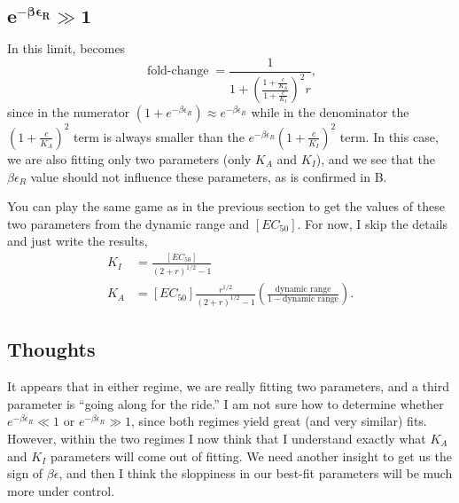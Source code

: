 \documentclass[10pt,letterpaper]{article}
\newcommand{\letter}[1]{#1} %
\newcommand \foldchange{\operatorname{fold-change}}
\begin{document}
\subsection{$\boldsymbol{e^{-\beta \epsilon_R} \gg 1}$}

In this limit, \eref[AppendixSloppinessEq1] becomes 
\begin{equation}
\foldchange = \frac{1}{1+\left(\frac{1 + \frac{c}{K_A}}{1 + \frac{c}{K_I}}\right)^2 r},
\end{equation}
since in the numerator $\left( 1 + e^{-\beta \epsilon_R} \right) \approx
e^{-\beta \epsilon_R}$ while in the denominator the
$\left(1+\frac{c}{K_A}\right)^2$ term is always smaller than the $e^{-\beta
	\epsilon_R} \left(1+\frac{c}{K_I}\right)^2$ term. In this case, we are also
fitting only two parameters (only $K_A$ and $K_I$), and we see that the $\beta
\epsilon_R$ value should not influence these parameters, as is confirmed in
\fref[SIfig1]\letter{B}.

You can play the same game as in the previous section to get the values of these two parameters from the dynamic range and $[EC_{50}]$. For now, I skip the details and just write the results,
\begin{align}
K_I &= \frac{[EC_{50}]}{\left(2+r\right)^{1/2}-1}\\
K_A &= [EC_{50}] \frac{r^{1/2}}{\left(2+r\right)^{1/2}-1} \left(\frac{\text{dynamic range}}{1-\text{dynamic range}}\right).
\end{align}

\subsection{Thoughts}

It appears that in either regime, we are really fitting two parameters, and a
third parameter is ``going along for the ride.'' I am not sure how to determine
whether $e^{-\beta \epsilon_R} \ll 1$ or $e^{-\beta \epsilon_R} \gg 1$, since
both regimes yield great (and very similar) fits. However, within the two
regimes I now think that I understand exactly what $K_A$ and $K_I$ parameters
will come out of fitting. We need another insight to get us the sign of $\beta
\epsilon$, and then I think the sloppiness in our best-fit parameters will be
much more under control.

\nolinenumbers



\end{document}
